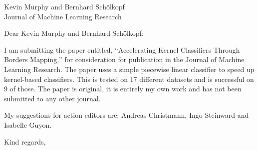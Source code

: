 \documentclass{letter}
\begin{document}
\begin{letter}{
		Kevin Murphy and Bernhard Sch\"olkopf\\
	Journal of Machine Learning Research}
\opening{Dear Kevin Murphy and Bernhard Sch\"olkopf:}

I am submitting the paper entitled, ``Accelerating Kernel Classifiers Through
Borders Mapping,'' for consideration for publication in the Journal of
Machine Learning Research. The paper uses a simple piecewise linear classifier
to speed up kernel-based classifiers. This is tested on 17 different datasets
and is successful on 9 of those. The paper is original, it is entirely my own work
and has not been submitted to any other journal.

My suggestions for action editors are: Andreas Christmann, Ingo Steinward and
Isabelle Guyon.

\closing{Kind regards,}

\end{letter}
\end{document}
